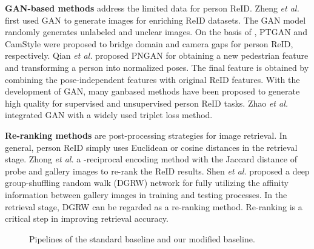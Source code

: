 \documentclass[journal]{IEEEtran}
\begin{document}
\textbf{GAN-based methods} \cite{zheng2017unlabeled,wei2018person,zhong2019camstyle,qian2018pose,zheng2019joint,zhao2018adversarial} address the limited data for person ReID.
Zheng \emph{et al.} \cite{zheng2017unlabeled} first used GAN \cite{goodfellow2014generative} to generate images for enriching ReID datasets.
The GAN model randomly generates unlabeled and unclear images.
On the basis of \cite{zheng2017unlabeled}, PTGAN \cite{wei2018person} and CamStyle \cite{zhong2019camstyle} were proposed to bridge domain and camera gaps for person ReID, respectively.
Qian \emph{et al.} \cite{qian2018pose} proposed PNGAN for obtaining a new pedestrian feature and transforming a person into normalized poses. The final feature is obtained by combining the pose-independent features with original ReID features. With the development of GAN, many ganbased methods have been proposed to generate high quality for supervised and unsupervised person ReID tasks.
Zhao \emph{et al.} \cite{zhao2018adversarial} integrated GAN with a widely used triplet loss method.

\textbf{Re-ranking methods} \cite{zhong2017re,shen2018deep,ye2016person,bai2019re} are post-processing strategies for image retrieval.
In general, person ReID simply uses Euclidean or cosine distances in the retrieval stage.
Zhong \emph{et al.} \cite{zhong2017re} a -reciprocal encoding method with the Jaccard distance of probe and gallery images to re-rank the ReID results.
Shen \emph{et al.} \cite{shen2018deep} proposed a deep group-shuffling random walk (DGRW) network for fully utilizing the affinity information between gallery images in training and testing processes. In the retrieval stage, DGRW can be regarded as a re-ranking method. Re-ranking is a critical step in improving retrieval accuracy.

\begin{figure*}[htt]
\centering
{}
\hfil
{}
\centering
\caption{Pipelines of the standard baseline and our modified baseline.}
\label{fig:arc}
\end{figure*}
\end{document}
